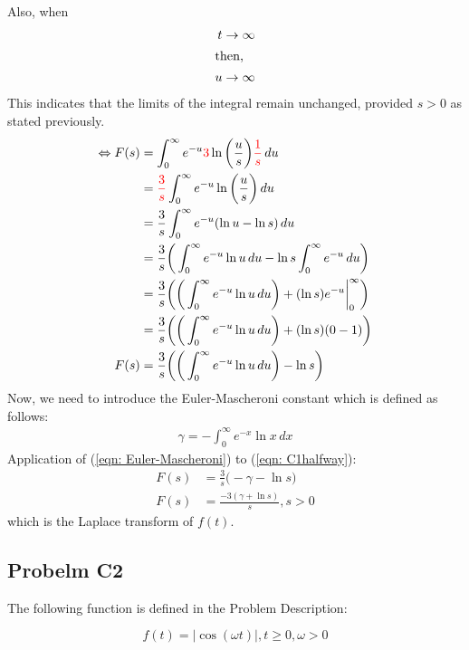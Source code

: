 \documentclass[a4paper,10pt,reqno]{amsart}
\numberwithin{equation}{section}
\begin{document}
Also, when
\begin{align*}
t \rightarrow \infty \\
\intertext{then,}
u \rightarrow \infty \\
\end{align*}
This indicates that the limits of the integral remain unchanged, provided $s>0$ as stated previously.
\begin{align}
\Leftrightarrow F(s) &= \int_{0}^{\infty} e^{-u} \textcolor{red}{3}\ln \bigg(\frac{u}{s}\bigg) \textcolor{red}{\frac{1}{s}} \,du  \nonumber \\
&= \textcolor{red}{\frac{3}{s}} \int_{0}^{\infty} e^{-u} \ln \bigg(\frac{u}{s}\bigg) \,du  \nonumber \\
&= \frac{3}{s} \int_{0}^{\infty} e^{-u} (\ln u - \ln s) \,du  \nonumber \\
&= \frac{3}{s} \bigg( \int_{0}^{\infty} e^{-u} \ln u \,du - \ln s  \int_{0}^{\infty} e^{-u} \,du \bigg) \nonumber \\
&= \frac{3}{s} \bigg(\bigg( \int_{0}^{\infty} e^{-u} \ln u \,du \bigg) + (\ln s) e^{-u} \bigg|_0^\infty \bigg) \nonumber \\
&= \frac{3}{s} \bigg(\bigg( \int_{0}^{\infty} e^{-u} \ln u \,du \bigg) + (\ln s) (0-1) \bigg) \nonumber \\
F(s)&= \frac{3}{s} \bigg(\bigg( \int_{0}^{\infty} e^{-u} \ln u \,du \bigg) - \ln s \bigg) \label{eqn: C1halfway}
\end{align}
Now, we need to introduce the Euler-Mascheroni constant which is defined as follows:
\begin{align}
\gamma = -\int_{0}^{\infty} e^{-x} \ln x \,dx \label{eqn: Euler-Mascheroni}
\end{align}
Application of (\ref{eqn: Euler-Mascheroni}) to (\ref{eqn: C1halfway}):
\begin{align}
F(s) &= \frac{3}{s} \bigg( -\gamma - \ln s \bigg) \nonumber \\
F(s) &= \frac{-3(\gamma + \ln s)}{s}, s>0 \label{eqn: C1final}
\end{align}
which is the Laplace transform of $f(t)$.


\subsection{Probelm C2}\label{sec:c2}

The following function is defined in the Problem Description:

\begin{equation}
    f(t) = |\cos(\omega t)|, t \geq 0, \omega > 0
\end{equation}
\end{document}
